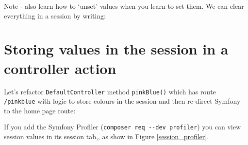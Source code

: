 \documentclass[a4paperpaper,openright]{book}
\newenvironment{Shaded}{}{}
\newcommand{\AnnotationTok}[1]{\textcolor[rgb]{0.38,0.63,0.69}{\textbf{\textit{#1}}}}
\newcommand{\CommentTok}[1]{\textcolor[rgb]{0.38,0.63,0.69}{\textit{#1}}}
\newcommand{\KeywordTok}[1]{\textcolor[rgb]{0.00,0.44,0.13}{\textbf{#1}}}
\newcommand{\NormalTok}[1]{#1}
\newcommand{\OtherTok}[1]{\textcolor[rgb]{0.00,0.44,0.13}{#1}}
\newcommand{\StringTok}[1]{\textcolor[rgb]{0.25,0.44,0.63}{#1}}
\begin{document}
Note - also learn how to `unset' values when you learn to set them. We
can clear everything in a session by writing:

\begin{Shaded}
\end{Shaded}

\hypertarget{storing-values-in-the-session-in-a-controller-action}{%
\section{Storing values in the session in a controller
action}\label{storing-values-in-the-session-in-a-controller-action}}

Let's refactor \texttt{DefaultController} method \texttt{pinkBlue()}
which has route \texttt{/pinkblue} with logic to store colours in the
session and then re-direct Symfony to the home page route:

\begin{Shaded}
\end{Shaded}

If you add the Symfony Profiler
(\texttt{composer\ req\ -\/-dev\ profiler}) you can view session values
in its session tab,, as show in Figure \ref{session_profiler}.
\end{document}
